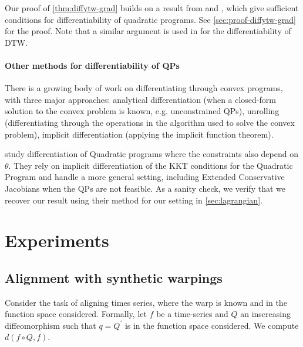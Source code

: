 Our proof of \cref{thm:diffytw-grad} builds on a result from \cite{shapiro} and \cite{lee}, which give sufficient conditions for differentiability of quadratic programs. See \cref{sec:proof-diffytw-grad} for the proof. Note that a similar argument is used in \cite{tavenar-blog-diff} for the differentiability of DTW.

\paragraph{Other methods for differentiability of QPs}
There is a growing body of work on differentiating through convex programs, with three major approaches: analytical differentiation (when a closed-form solution to the convex problem is known, e.g. unconstrained QPs), unrolling (differentiating through the operations in the algorithm used to solve the convex problem), implicit differentiation (applying the implicit function theorem).

\begin{remark}
    \cite{bambade,optnet,...} study differentiation of Quadratic programs where the constraints also depend on $\theta$. They rely on implicit differentiation of the KKT conditions for the Quadratic Program and handle a more general setting, including Extended Conservative Jacobians when the QPs are not feasible. As a sanity check, we verify that we recover our result using their method for our setting in \cref{sec:lagrangian}.
\end{remark}

\section{Experiments}

\subsection{Alignment with synthetic warpings}

Consider the task of aligning times series, where the warp is known and in the function space considered. Formally, let $f$ be a time-series and $Q$ an inscreasing diffeomorphism such that $q = Q^\prime$ is in the function space considered. We compute $d(f\circ Q, f)$.





